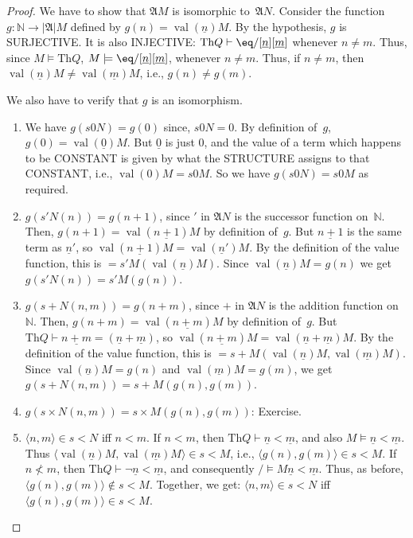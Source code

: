 \documentclass[10pt,a4paper]{article}
\newcommand*{\olup}[1]{\MakeUppercase{#1}}
\theoremstyle{plain}
\theoremstyle{definition}
\theoremstyle{remark}
\providecommand{\Proves}{\mathrel{\vdash}}
\providecommand{\Obj}{}
\providecommand{\Struct}{\ensuremath{\mathfrak{A}}}
\providecommand{\Domain}{\ensuremath{|\mathfrak{A}|}}
\providecommand{\Assign}{\ensuremath{s}}
\providecommand{\Sat}[2]{\ensuremath{#1 \models #2}}
\providecommand{\Th}{\ensuremath{\mathrm{Th}}}
\providecommand{\tuple}[1]{\langle #1 \rangle}
\providecommand{\num}[1]{\underline{#1}}
\providecommand{\Nat}{\ensuremath{\mathbb{N}}}
\providecommand{\Value}[1]{\operatorname{val}(#1)}
\begin{document}
\begin{proof}
We have to show that $\Struct{M}$ is isomorphic
to~$\Struct{N}$. Consider the function $g\colon \Nat \to \Domain{M}$
defined by $g(n) = \Value{\num{n}}{M}$. By the hypothesis, $g$ is
\olup{surjective}.  It is also \olup{injective}: $\Th{Q} \Proves
\eq/[\num{n}][\num{m}]$ whenever $n \neq m$. Thus, since
$\Sat{M}{\Th{Q}}$, $\Sat{M}{\eq/[\num{n}][\num{m}]}$, whenever $n \neq
m$. Thus, if $n \neq m$, then $\Value{\num{n}}{M} \neq
\Value{\num{m}}{M}$, i.e., $g(n) \neq g(m)$.

We also have to verify that $g$ is an isomorphism.
\begin{enumerate}
\item We have $g(\Assign{\Obj{0}}{N}) = g(0)$ since,
  $\Assign{\Obj{0}}{N} = 0$. By definition of~$g$, $g(0) =
  \Value{\num{0}}{M}$. But $\num{0}$ is just $\Obj{0}$, and the value
  of a term which happens to be \olup{constant} is given by what the
  \olup{structure} assigns to that \olup{constant}, i.e.,
  $\Value{\Obj{0}}{M} = \Assign{\Obj{0}}{M}$. So we have
  $g(\Assign{\Obj{0}}{N}) = \Assign{\Obj{0}}{M}$ as required.
\item $g(\Assign{\prime}{N}(n)) = g(n+1)$, since $\prime$ in
  $\Struct{N}$ is the successor function on~$\Nat$. Then, $g(n+1) =
  \Value{\num{n+1}}{M}$ by definition of~$g$. But $\num{n+1}$ is the
  same term as $\num{n}'$, so $\Value{\num{n+1}}{M} =
  \Value{\num{n}'}{M}$. By the definition of the value function, this
  is $= \Assign{\prime}{M}(\Value{\num{n}}{M})$. Since
    $\Value{\num{n}}{M} = g(n)$ we get $g(\Assign{\prime}{N}(n)) =
  \Assign{\prime}{M}(g(n))$.
\item $g(\Assign{+}{N}(n,m)) = g(n+m)$, since $+$ in $\Struct{N}$ is
  the addition function on~$\Nat$. Then, $g(n+m) =
  \Value{\num{n+m}}{M}$ by definition of~$g$. But $\Th{Q} \Proves
  \num{n+m} = (\num{n} + \num{m})$, so $\Value{\num{n+m}}{M} =
  \Value{\num{n}+\num{m}}{M}$. By the definition of the value
  function, this is $=
  \Assign{+}{M}(\Value{\num{n}}{M},\Value{\num{m}}{M})$. Since
    $\Value{\num{n}}{M} = g(n)$ and $\Value{\num{m}}{M} = g(m)$, we
    get $g(\Assign{+}{N}(n, m)) = \Assign{+}{M}(g(n), g(m))$.
\item $g(\Assign{\times}{N}(n, m)) = \Assign{\times}{M}(g(n), g(m))$:
  Exercise.
\item $\tuple{n,m} \in \Assign{<}{N}$ iff $n < m$. If $n < m$, then
  $\Th{Q} \Proves \num{n} < \num{m}$, and also $\Sat{M}{\num{n} <
  \num{m}}$. Thus $\tuple{\Value{\num{n}}{M}, \Value{\num{m}}{M}} \in
  \Assign{<}{M}$, i.e., $\tuple{g(n), g(m)} \in \Assign{<}{M}$. If $n
  \not< m$, then $\Th{Q} \Proves \lnot \num{n} < \num{m}$, and
  consequently $\Sat/{M}{\num{n} < \num{m}}$. Thus, as before,
  $\tuple{g(n), g(m)} \notin \Assign{<}{M}$. Together, we get:
  $\tuple{n,m} \in \Assign{<}{N}$ iff $\tuple{g(n), g(m)} \in
  \Assign{<}{M}$.
\end{enumerate}
\end{proof}
\end{document}
